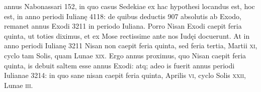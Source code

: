 annus Nabonassari 152, in quo casus Sedekiae ex hac hypothesi
locandus est, hoc est, in anno periodi Iulianę 4118: de quibus deductis
907 absolutis ab Exodo, remanet annus Exodi 3211 in periodo Iuliana.
Porro Nisan Exodi caepit feria quinta, ut toties diximus, et ex
Mose rectissime ante nos Iudęi docuerunt.
At in anno periodi Iulianę
3211 Nisan non caepit feria quinta, sed feria tertia,
 Martii \textsc{xi}, cyclo tam
Solis, quam Lunae \textsc{xix}.
{}
Ergo annus proximus, quo Nisan caepit feria
quinta, is debuit saltem esse annus Exodi: atq; adeo is fuerit annus periodi
Iulianae 3214: in quo sane nisan caepit feria quinta, Aprilis \textsc{vi},
cyclo Solis \textsc{xxii}, Lunae \textsc{iii}.

